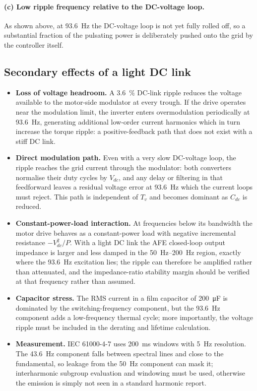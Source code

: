 \documentclass[11pt,a4paper]{article}
\begin{document}
\paragraph{(c) Low ripple frequency relative to the DC-voltage loop.} As shown
above, at \SI{93.6}{\hertz} the DC-voltage loop is not yet fully rolled off, so a
substantial fraction of the pulsating power is deliberately pushed onto the
grid by the controller itself.

\subsection{Secondary effects of a light DC link}

\begin{itemize}
\item \textbf{Loss of voltage headroom.} A \SI{3.6}{\percent} DC-link ripple
      reduces the voltage available to the motor-side modulator at every trough.
      If the drive operates near the modulation limit, the inverter enters
      overmodulation periodically at \SI{93.6}{\hertz}, generating additional
      low-order current harmonics which in turn increase the torque ripple: a
      positive-feedback path that does not exist with a stiff DC link.
\item \textbf{Direct modulation path.} Even with a very slow DC-voltage loop,
      the ripple reaches the grid current through the modulator: both converters
      normalise their duty cycles by $V_{dc}$, and any delay or filtering in
      that feedforward leaves a residual voltage error at \SI{93.6}{\hertz}
      which the current loops must reject. This path is independent of $T_{v}$
      and becomes dominant as $C_{dc}$ is reduced.
\item \textbf{Constant-power-load interaction.} At frequencies below its
      bandwidth the motor drive behaves as a constant-power load with negative
      incremental resistance $-V_{dc}^{2}/P$. With a light DC link the AFE
      closed-loop output impedance is larger and less damped in the
      \SIrange{50}{200}{\hertz} region, exactly where the \SI{93.6}{\hertz}
      excitation lies; the ripple can therefore be amplified rather than
      attenuated, and the impedance-ratio stability margin should be verified at
      that frequency rather than assumed.
\item \textbf{Capacitor stress.} The RMS current in a film capacitor of
      \SI{200}{\micro\farad} is dominated by the switching-frequency component,
      but the \SI{93.6}{\hertz} component adds a low-frequency thermal cycle;
      more importantly, the voltage ripple must be included in the derating and
      lifetime calculation.
\item \textbf{Measurement.} IEC 61000-4-7 uses \SI{200}{\milli\second} windows
      with \SI{5}{\hertz} resolution. The \SI{43.6}{\hertz} component falls
      between spectral lines and close to the fundamental, so leakage from the
      \SI{50}{\hertz} component can mask it; interharmonic subgroup evaluation
      and windowing must be used, otherwise the emission is simply not seen in a
      standard harmonic report.
\end{itemize}
\end{document}
